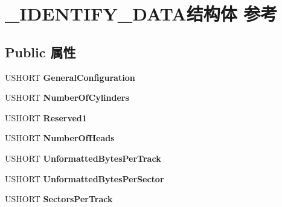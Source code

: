\hypertarget{struct___i_d_e_n_t_i_f_y___d_a_t_a}{}\section{\+\_\+\+I\+D\+E\+N\+T\+I\+F\+Y\+\_\+\+D\+A\+T\+A结构体 参考}
\label{struct___i_d_e_n_t_i_f_y___d_a_t_a}
\subsection*{Public 属性}
\begin{DoxyCompactItemize}
\item 
\mbox{\label{struct___i_d_e_n_t_i_f_y___d_a_t_a_a44be538188351c44d092786ee38c09a4}} 
U\+S\+H\+O\+RT {\bfseries General\+Configuration}
\item 
\mbox{\label{struct___i_d_e_n_t_i_f_y___d_a_t_a_a5138cf9f8430ab6c160ed4f3bb92bc17}} 
U\+S\+H\+O\+RT {\bfseries Number\+Of\+Cylinders}
\item 
\mbox{\label{struct___i_d_e_n_t_i_f_y___d_a_t_a_af69766896fd2a767ba1246e5553eb0b7}} 
U\+S\+H\+O\+RT {\bfseries Reserved1}
\item 
\mbox{\label{struct___i_d_e_n_t_i_f_y___d_a_t_a_a41632e8b40e3aa8240598653fd9f859f}} 
U\+S\+H\+O\+RT {\bfseries Number\+Of\+Heads}
\item 
\mbox{\label{struct___i_d_e_n_t_i_f_y___d_a_t_a_a99de8fc2d4a40cca92ccaacd37d97901}} 
U\+S\+H\+O\+RT {\bfseries Unformatted\+Bytes\+Per\+Track}
\item 
\mbox{\label{struct___i_d_e_n_t_i_f_y___d_a_t_a_a13f86c90a63e34e1758d7b8803629c12}} 
U\+S\+H\+O\+RT {\bfseries Unformatted\+Bytes\+Per\+Sector}
\item 
\mbox{\label{struct___i_d_e_n_t_i_f_y___d_a_t_a_acea08153c2ed8bda03cb894cba1ee206}} 
U\+S\+H\+O\+RT {\bfseries Sectors\+Per\+Track}
\item 
\mbox{\label{struct___i_d_e_n_t_i_f_y___d_a_t_a_ad30e6c0b72c1ce3d2ec99467bba2132e}} 

\end{DoxyCompactItemize}
